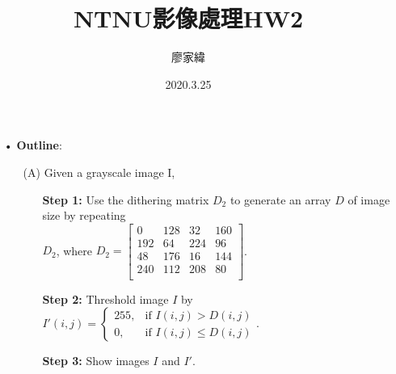 \documentclass[12pt,a4paper]{article}
\title{NTNU影像處理HW2}
\author{廖家緯}
\date{2020.3.25}
\begin{document}
\maketitle
\fontsize{12pt}{20pt}\selectfont
\setlength{\baselineskip}{20pt}

\pagestyle{fancy}
\lhead{}
\chead{}
\rhead{}
\lfoot{}
\cfoot{\thepage}
\rfoot{}
\renewcommand{\headrulewidth}{0pt} %
\renewcommand{\footrulewidth}{0pt} %




\begin{enumerate}
\item[•]{\bf Outline}:
\begin{enumerate}
\item[(A)]Given a grayscale image I,
\begin{enumerate}
\item[\bf Step 1:]
Use the dithering matrix $D_2$ to generate an    
array $D$ of image size by repeating
\vspace*{0.5mm}\\
$D_2$, where
$D_2 = \left[
\begin{array}{cccc}
0 & 128 & 32 & 160\\
192 & 64 & 224 & 96\\
48 & 176 & 16 &144\\
240 & 112 & 208 & 80\\
\end{array}             
\right]$.\vspace*{0.5cm}\\
\item[\bf Step 2:]
Threshold image $I$ by
$I'(i, j) = \begin{cases}
255, & \text{if } I(i,j)>D(i,j)\\
0, & \text{if } I(i,j) \leq D(i,j)
\end{cases}$.
\item[\bf Step 3:]
Show images $I$ and $I'$.\\
\end{enumerate}


\end{enumerate}
\end{enumerate}
\end{document}
